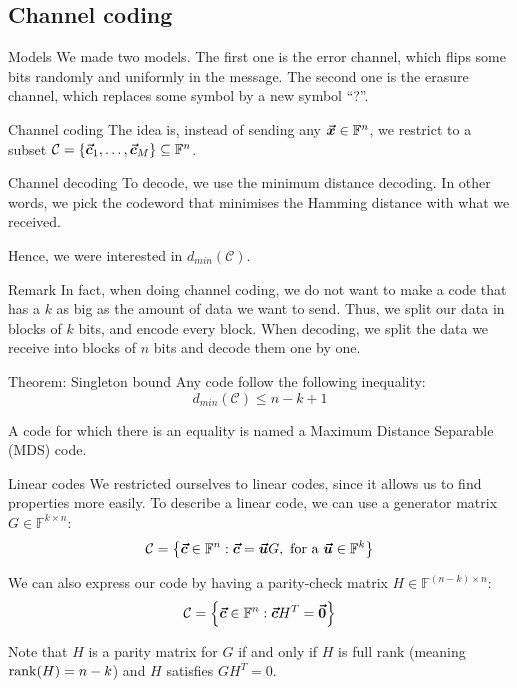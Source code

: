 \documentclass[a4paper]{article}
\begin{document}
\subsection{Channel coding}
\begin{parag}{Models}
    We made two models. The first one is the error channel, which flips some bits randomly and uniformly in the message. The second one is the erasure channel, which replaces some symbol by a new symbol ``?''.
\end{parag}

\begin{parag}{Channel coding}
    The idea is, instead of sending any $\bm{\protect\vec{x}} \in \mathbb{F}^n$, we restrict to a subset $\mathcal{C} = \left\{\bvec{c}_1, \ldots, \bvec{c}_M\right\} \subseteq \mathbb{F}^n$.
\end{parag}

\begin{parag}{Channel decoding}
    To decode, we use the minimum distance decoding. In other words, we pick the codeword that minimises the Hamming distance with what we received.

    Hence, we were interested in $d_{min}\left(\mathcal{C}\right)$.
\end{parag}

\begin{parag}{Remark}
    In fact, when doing channel coding, we do not want to make a code that has a $k$ as big as the amount of data we want to send. Thus, we split our data in blocks of $k$ bits, and encode every block. When decoding, we split the data we receive into blocks of $n$ bits and decode them one by one.
\end{parag}

\begin{parag}{Theorem: Singleton bound}
    Any code follow the following inequality: 
    \[d_{min}\left(\mathcal{C}\right) \leq n - k + 1\]

    A code for which there is an equality is named a Maximum Distance Separable (MDS) code.
\end{parag}

\begin{parag}{Linear codes}
    We restricted ourselves to linear codes, since it allows us to find properties more easily. To describe a linear code, we can use a generator matrix $G \in \mathbb{F}^{k \times n}$: 
    \[\mathcal{C} = \left\{\bvec{c} \in \mathbb{F}^n : \bvec{c} = \bvec{u} G, \text{ for a } \bvec{u} \in \mathbb{F}^k\right\}\]
    
    We can also express our code by having a parity-check matrix $H \in \mathbb{F}^{\left(n-k\right) \times n}$: 
    \[\mathcal{C} = \left\{\bvec{c} \in \mathbb{F}^n : \bvec{c} H^T = \bvec{0}\right\}\]

    Note that $H$ is a parity matrix for $G$ if and only if $H$ is full rank (meaning $\rank\left(H\right) = n -k$) and $H$ satisfies $GH^T = 0$.
\end{parag}
\end{document}
